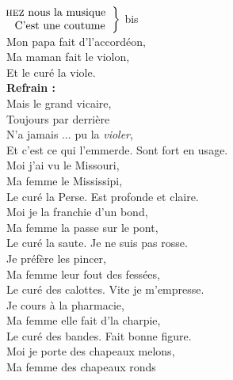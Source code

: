 
\\ 
$\left.\begin{tabular}{l}
\hspace{-0.4cm}
\textsc{hez} nous la musique
\hspace{-0.4cm}
\\
C'est une coutume
\end{tabular}\right\rbrace$ bis
\\Mon papa fait d'l'accordéon, \bissimple
\\Ma maman fait le violon, \bissimple
\\Et le curé la viole. \bissimple
\\\textbf{Refrain :}
\\Mais le grand vicaire,
\\Toujours par derrière 
\\N'a jamais ... pu la \textit{violer},
\\Et c'est ce qui l'emmerde. \bissimple
{}
{Sont fort en usage.}
\\Moi j'ai vu le Missouri, \bissimple
\\Ma femme le Mississipi, \bissimple
\\Le curé la Perse.  \bissimple
{}
{Est profonde et claire.}
\\Moi je la franchie d'un bond, \bissimple
\\Ma femme la passe sur le pont, \bissimple
\\Le curé la saute. \bissimple
{}
{Je ne suis pas rosse.}
\\Je préfère les pincer, \bissimple
\\Ma femme leur fout des fessées, \bissimple
\\Le curé des calottes. \bissimple
{}
{Vite je m'empresse.}
\\Je cours à la pharmacie, \bissimple
\\Ma femme elle fait d'la charpie, \bissimple
\\Le curé des bandes. \bissimple
\breakpage
{}
{Fait bonne figure.}
\\Moi je porte des chapeaux melons, \bissimple
\\Ma femme des chapeaux ronds \bissimple
